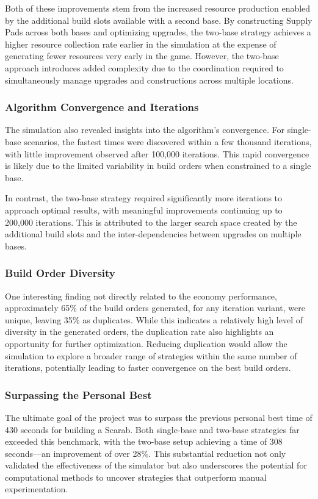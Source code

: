 \documentclass[a4paper, 12pt, english]{article}
\begin{document}
Both of these improvements stem from the increased resource production enabled by the additional build slots available with a second base. By constructing Supply Pads across both bases and optimizing upgrades, the two-base strategy achieves a higher resource collection rate earlier in the simulation at the expense of generating fewer resources very early in the game. However, the two-base approach introduces added complexity due to the coordination required to simultaneously manage upgrades and constructions across multiple locations.
\newline

\subsubsection{Algorithm Convergence and Iterations}
The simulation also revealed insights into the algorithm's convergence. For single-base scenarios, the fastest times were discovered within a few thousand iterations, with little improvement observed after 100,000 iterations. This rapid convergence is likely due to the limited variability in build orders when constrained to a single base. 
\newline 

In contrast, the two-base strategy required significantly more iterations to approach optimal results, with meaningful improvements continuing up to 200,000 iterations. This is attributed to the larger search space created by the additional build slots and the inter-dependencies between upgrades on multiple bases.
\newline

\subsubsection{Build Order Diversity}
One interesting finding not directly related to the economy performance, approximately 65\% of the build orders generated, for any iteration variant, were unique, leaving 35\% as duplicates. While this indicates a relatively high level of diversity in the generated orders, the duplication rate also highlights an opportunity for further optimization. Reducing duplication would allow the simulation to explore a broader range of strategies within the same number of iterations, potentially leading to faster convergence on the best build orders.
\newline

\subsubsection{Surpassing the Personal Best}
The ultimate goal of the project was to surpass the previous personal best time of 430 seconds for building a Scarab. Both single-base and two-base strategies far exceeded this benchmark, with the two-base setup achieving a time of 308 seconds—an improvement of over 28\%. This substantial reduction not only validated the effectiveness of the simulator but also underscores the potential for computational methods to uncover strategies that outperform manual experimentation.
\newline
\end{document}
